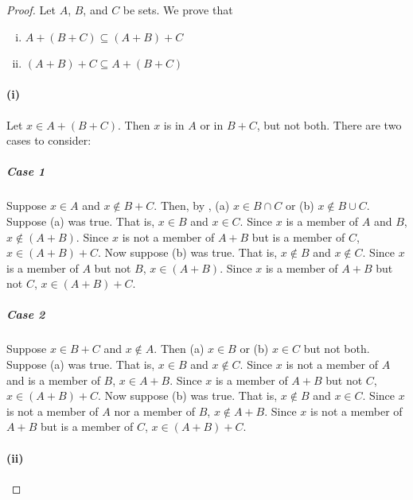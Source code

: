 \documentclass{report}
\begin{document}
\begin{proof}


  \noindent Let $A$, $B$, and $C$ be sets.
  We prove that
    \begin{enumerate}[(i)]
      \item $A + (B + C) \subseteq (A + B) + C$
      \item $(A + B) + C \subseteq A + (B + C)$
    \end{enumerate}

  \paragraph{(i)}%

    Let $x \in A + (B + C)$.
    Then $x$ is in $A$ or in $B + C$, but not both.
    There are two cases to consider:

    \subparagraph{Case 1}%

      Suppose $x \in A$ and $x \not\in B + C$.
      Then, by ,
        (a) $x \in B \cap C$ or (b) $x \not\in B \cup C$.
      Suppose (a) was true.
      That is, $x \in B$ and $x \in C$.
      Since $x$ is a member of $A$ and $B$, $x \not\in (A + B)$.
      Since $x$ is not a member of $A + B$ but is a member of $C$,
        $x \in (A + B) + C$.
      Now suppose (b) was true.
      That is, $x \not\in B$ and $x \not\in C$.
      Since $x$ is a member of $A$ but not $B$, $x \in (A + B)$.
      Since $x$ is a member of $A + B$ but not $C$, $x \in (A + B) + C$.

    \subparagraph{Case 2}%

      Suppose $x \in B + C$ and $x \not\in A$.
      Then (a) $x \in B$ or (b) $x \in C$ but not both.
      Suppose (a) was true.
      That is, $x \in B$ and $x \not\in C$.
      Since $x$ is not a member of $A$ and is a member of $B$, $x \in A + B$.
      Since $x$ is a member of $A + B$ but not $C$, $x \in (A + B) + C$.
      Now suppose (b) was true.
      That is, $x \not\in B$ and $x \in C$.
      Since $x$ is not a member of $A$ nor a member of $B$, $x \not\in A + B$.
      Since $x$ is not a member of $A + B$ but is a member of $C$,
        $x \in (A + B) + C$.

  \paragraph{(ii)}%


\end{proof}
\end{document}
